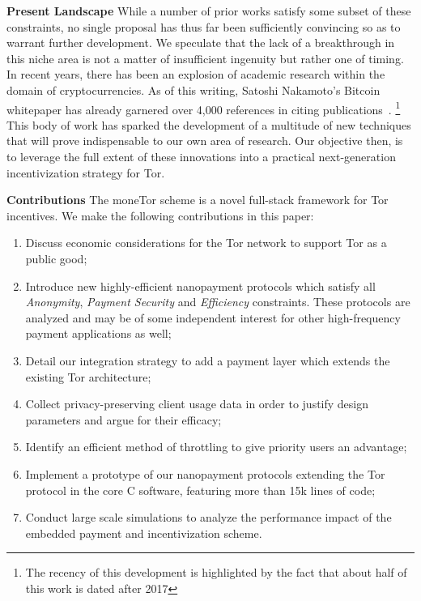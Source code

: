 \textbf{Present Landscape} While a number of prior works satisfy some subset of
these constraints, no single proposal has thus far been sufficiently convincing
so as to warrant further development. We speculate that the lack of a
breakthrough in this niche area is not a matter of insufficient ingenuity but
rather one of timing. In recent years, there has been an explosion of academic
research within the domain of cryptocurrencies. As of this writing, Satoshi
Nakamoto's Bitcoin whitepaper has already garnered over 4,000 references in
citing publications~\cite{nakamoto2008bitcoin}.  \footnote{The recency of this
  development is highlighted by the fact that about half of this work is dated
  after 2017}  This body of work has sparked the development of a multitude of
new techniques that will prove indispensable to our own area of research. Our
objective then, is to leverage the full extent of these innovations into a
practical next-generation incentivization strategy for Tor.

\label{sec:Contributions}
\textbf{Contributions} The moneTor scheme is a novel full-stack framework for
Tor incentives. We make the following contributions in this paper:

\begin{enumerate}
\item Discuss economic considerations for the Tor network %
  to support Tor as a public good;
\item Introduce new highly-efficient nanopayment protocols which satisfy all
  \emph{Anonymity}, \emph{Payment Security} and \emph{Efficiency}
  constraints. These protocols are %
  analyzed and may be of some independent interest for
  other high-frequency payment applications as well;
\item Detail our integration strategy to add a payment layer
  which extends the existing Tor architecture;
\item Collect privacy-preserving client usage data in order to justify design parameters
  and argue for their efficacy;
\item Identify an efficient method of throttling to give priority users an
  advantage;
\item Implement a prototype of our nanopayment protocols extending the Tor protocol
  in the core C software, featuring more than 15k lines of code; %
\item Conduct large scale simulations to analyze the performance impact of the
  embedded payment and incentivization scheme.
\end{enumerate}

